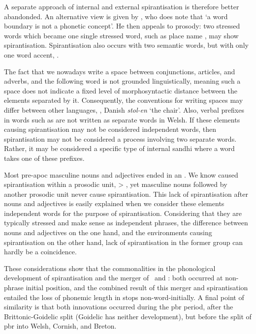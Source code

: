 A separate approach of internal and external spirantisation is therefore better abandonded. An alternative view is given by \textcite[126--129]{koch_neo-brittonic_1989}, who does note that `a word boundary is not a phonetic concept'.
He then appeals to prosody: two stressed words which became one single stressed word, such as place name , may show spirantisation.
Spirantisation also occurs with two semantic words, but with only one word accent, \eg {}.

The fact that we nowadays write a space between conjunctions, articles, and adverbs, \etc and the following word is not grounded linguistically, meaning such a space does not indicate a fixed level of morphosyntactic distance between the elements separated by it. Consequently, the conventions for writing spaces may differ between other languages, \eg {}, Danish \textit{stol-en} `the chair'.
Also, verbal prefixes in words such as  are not written as separate words in Welsh.
If  these elements causing spirantisation may not be considered independent words, then spirantisation may not be considered a process involving two separate words.
Rather, it may be considered a specific type of internal sandhi where a word takes one of these prefixes.

Most pre-\gls{apoc} masculine  nouns and adjectives ended in an .
We know  caused spirantisation within a prosodic unit, \eg {} > , yet masculine nouns followed by another prosodic unit never cause spirantisation.
This lack of spirantisation after nouns and adjectives is easily explained when we consider these elements independent words for the purpose of spirantisation.
Considering that they are typically stressed and make sense as independent phrases, the difference between nouns and adjectives on the one hand, and the environments causing spirantisation on the other hand, lack of spirantisation in the former group can hardly be a coincidence.

These considerations show that the commonalities in the phonological development of spirantisation and the merger of \xD\ and \lT: both occurred at non-phrase initial position, and the combined result of this merger and spirantisation entailed the loss of phonemic length in stops non-word-initially.
A final point of similarity is that both innovations occurred during the \gls{pbr} period, after the Brittonic-Goidelic split (Goidelic has neither development), but before the split of \gls{pbr} into Welsh, Cornish, and Breton.

